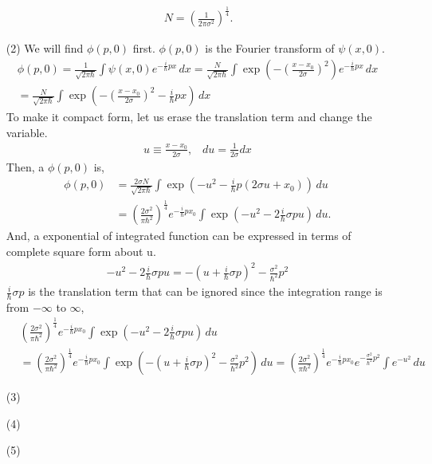 \documentclass[floatfix,nofootinbib,superscriptaddress,fleqn]{revtex4}
\begin{document}
\begin{itemize}
\begin{align}
    \,N = {\left(\frac{1}{2\pi\sigma^2}\right)}^{\frac{1}{4}}.
  \end{align}
  \item[(2)]  We will find $\phi(p,0)$ first. $\phi(p,0)$ is the Fourier transform of $\psi(x,0)$.
  \begin{align}
    \phi(p,0)=\frac{1}{\sqrt{2\pi\hbar}}
    \int\psi(x,0) e^{-\frac{i}{\hbar}px}\,dx
      =\frac{N}{\sqrt{2\pi\hbar}}
      \int\exp\left(-{\left(\frac{x-x_0}{2\sigma}\right)}^2\right) 
      e^{-\frac{i}{\hbar}px}\,dx  \\
      =\frac{N}{\sqrt{2\pi\hbar}}
      \int\exp\left(-{\left(\frac{x-x_0}{2\sigma}\right)}^2
      -\frac{i}{\hbar}px\right)\,dx
  \end{align}
  To make it compact form, let us erase the translation term and change the variable.
  \begin{align}
    u \equiv \frac{x-x_0}{2\sigma},\;\;\; du = \frac{1}{2\sigma} dx 
  \end{align}
  Then, a $\phi(p,0)$ is,
  \begin{align}
    \phi(p,0)&=\frac{2\sigma N}{\sqrt{2\pi\hbar}}
    \int\exp\left(-{u}^2-\frac{i}{\hbar}p(2\sigma u+x_0)\right)\,du \\
             &={\left(\frac{2\sigma^2}{\pi\hbar^2}\right)}^{\frac{1}{4}}
    e^{-\frac{i}{\hbar}px_0}
    \int\exp\left(-u^2-2\frac{i}{\hbar}\sigma pu\right)\,du.
  \end{align}
  And, a exponential of integrated function can be expressed in terms of complete square form about u.
  \begin{align}
    -u^2-2\frac{i}{\hbar}\sigma pu 
    = -{\left( u+\frac{i}{\hbar}\sigma p\right)}^2-\frac{\sigma^2}{\hbar^2}p^2
  \end{align}
  $\frac{i}{\hbar}\sigma p$ is the translation term that can be ignored since the integration range is from $-\infty$ to $\infty$,
  \begin{align}
    &{\left(\frac{2\sigma^2}{\pi\hbar^2}\right)}^{\frac{1}{4}}
    e^{-\frac{i}{\hbar}px_0}
    \int\exp\left(-u^2-2\frac{i}{\hbar}\sigma pu\right)\,du \\
    &={\left(\frac{2\sigma^2}{\pi\hbar^2}\right)}^{\frac{1}{4}}
    e^{-\frac{i}{\hbar}px_0}  
    \int\exp\left(-{\left( u+\frac{i}{\hbar}\sigma p\right)}^2-\frac{\sigma^2}{\hbar^2}p^2\right)\,du
    = {\left(\frac{2\sigma^2}{\pi\hbar^2}\right)}^{\frac{1}{4}}
    e^{-\frac{i}{\hbar}px_0}
    e^{-\frac{\sigma^2}{\hbar^2}p^2}
    \int e^{-u^2}\,du
  \end{align}
  \item[(3)] 
  \item[(4)] 
  \item[(5)] 
  \end{itemize}
\vspace{0.5cm}
\end{document}
